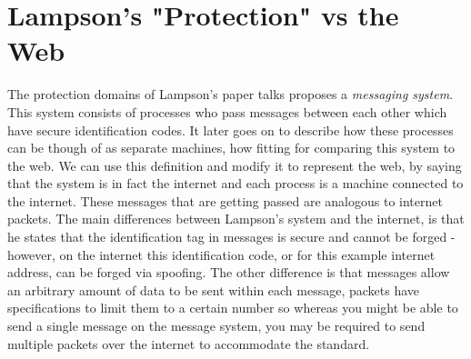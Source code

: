 \documentclass[11pt]{amsart}
\begin{document}
\section{Lampson's "Protection" vs the Web}
The protection domains of Lampson's paper talks proposes a \emph{messaging system}.  This system consists of processes who pass messages between each other which have secure identification codes.  It later goes on to describe how these processes can be though of as separate machines, how fitting for comparing this system to the web.  We can use this definition and modify it to represent the web, by saying that the system is in fact the internet and each process is a machine connected to the internet.  These messages that are getting passed are analogous to internet packets.  The main differences between Lampson's system and the internet, is that he states that the identification tag in messages is secure and cannot be forged - however, on the internet this identification code, or for this example internet address, can be forged via spoofing.  The other difference is that messages allow an arbitrary amount of data to be sent within each message, packets have specifications to limit them to a certain number so whereas you might be able to send a single message on the message system, you may be required to send multiple packets over the internet to accommodate the standard.
\end{document}
